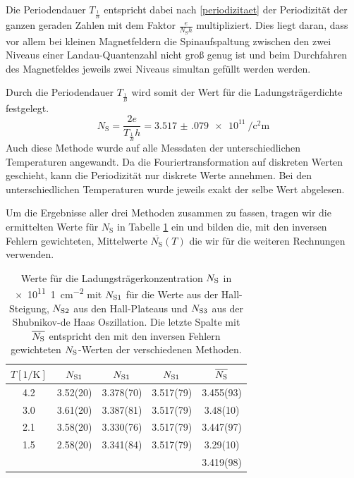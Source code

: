 \documentclass[paper=a4,fontsize=10pt,DIV=18,twocolumn,parskip=half]{scrartcl}
\numberwithin{equation}{section}    %
\begin{document}
Die Periodendauer $T_{\frac{1}{B}}$ entspricht dabei nach \eqref{periodizitaet} der Periodizität der ganzen geraden Zahlen mit dem Faktor $\frac{e}{N_\mathrm{S} h}$ multipliziert. Dies liegt daran, dass vor allem bei kleinen Magnetfeldern die Spinaufspaltung zwischen den zwei Niveaus einer Landau-Quantenzahl nicht groß genug ist und beim Durchfahren des Magnetfeldes jeweils zwei Niveaus simultan gefüllt werden werden.

Durch die Periodendauer $T_{\frac{1}{B}}$ wird somit der Wert für die Ladungsträgerdichte festgelegt.
\begin{equation}
N_\mathrm{S}=\frac{2 e}{T_{\frac{1}{B}} h}=\SI{3.517(079)e11}{\per\square\centi\meter}
\label{ns_periode}
\end{equation}
Auch diese Methode wurde auf alle Messdaten der unterschiedlichen Temperaturen angewandt. Da die Fouriertransformation auf diskreten Werten geschieht, kann die Periodizität nur diskrete Werte annehmen. Bei den unterschiedlichen Temperaturen wurde jeweils exakt der selbe Wert abgelesen.

Um die Ergebnisse aller drei Methoden zusammen zu fassen, tragen wir die ermittelten Werte für $N_\mathrm{S}$ in Tabelle \ref{nswerte} ein und bilden die, mit den inversen Fehlern gewichteten, Mittelwerte $\overline{N_\mathrm{S}}(T)$ die wir für die weiteren Rechnungen verwenden.

\begin{table}[htp]
	\begin{center}
		\begin{tabular}{ccccc}
			\hline
			$T[1/\mathrm{K}]$ & $N_{\rm S1}$ & $N_{\rm S1}$ & $N_{\rm S1}$ & $\overline{N_{\rm S}}$\\
			\hline
			4.2 & 3.52(20) & 3.378(70) & 3.517(79) & 3.455(93)\\
			3.0 & 3.61(20) & 3.387(81) & 3.517(79) & 3.48(10)\\
			2.1 & 3.58(20) & 3.330(76) & 3.517(79) & 3.447(97)\\
			1.5 & 2.58(20) & 3.341(84) & 3.517(79) & 3.29(10)\\
			\hline
			\hline
			 &  &  &  &3.419(98)\\
		\end{tabular}
		\caption{Werte für die Ladungsträgerkonzentration $N_{\rm S}$ in \SI[per-mode=symbol]{e11}{1\per\centi\meter\squared} mit $N_{\rm S1}$ für die Werte aus der Hall-Steigung, $N_{\rm S2}$ aus den Hall-Plateaus und $N_{\rm S3}$ aus der Shubnikov-de Haas Oszillation. Die letzte Spalte mit $\overline{N_{\rm S}}$ entspricht den mit den inversen Fehlern gewichteten $N_{\rm S}$-Werten der verschiedenen Methoden.}
		\label{nswerte}
	\end{center}
\end{table}
\end{document}
